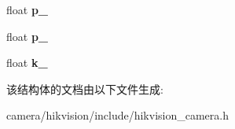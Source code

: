 \begin{DoxyCompactItemize}
float {\bfseries p\+\_}
\item 
\mbox{\label{structcamera_1_1_hik_camera_1_1_camera_calibration_struct_ae3bcfd9002dd083f3c425dc59f2bfc56}} 
float {\bfseries p\+\_}
\item 
\mbox{\label{structcamera_1_1_hik_camera_1_1_camera_calibration_struct_ac2bf229727d84851e52fff3408bf23d3}} 
float {\bfseries k\+\_}
\end{DoxyCompactItemize}


该结构体的文档由以下文件生成\+:\begin{DoxyCompactItemize}
\item 
camera/hikvision/include/hikvision\+\_\+camera.\+h\end{DoxyCompactItemize}
